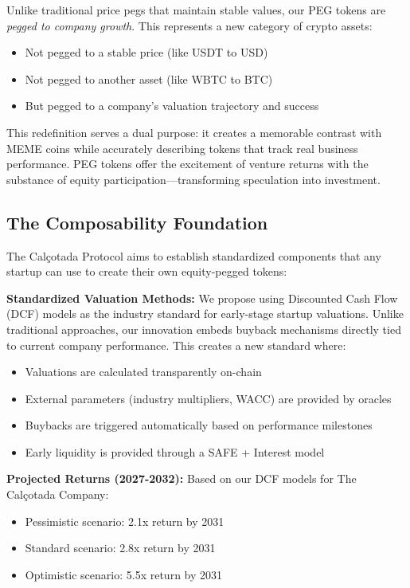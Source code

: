 \documentclass[conference]{IEEEtran}
\begin{document}
Unlike traditional price pegs that maintain stable values, our PEG tokens are \textit{pegged to company growth}. This represents a new category of crypto assets:
\begin{itemize}
    \item Not pegged to a stable price (like USDT to USD)
    \item Not pegged to another asset (like WBTC to BTC)
    \item But pegged to a company's valuation trajectory and success
\end{itemize}

This redefinition serves a dual purpose: it creates a memorable contrast with MEME coins while accurately describing tokens that track real business performance. PEG tokens offer the excitement of venture returns with the substance of equity participation—transforming speculation into investment.

\subsection{The Composability Foundation}

The Calçotada Protocol aims to establish standardized components that any startup can use to create their own equity-pegged tokens:

\textbf{Standardized Valuation Methods:}
We propose using Discounted Cash Flow (DCF) models as the industry standard for early-stage startup valuations. Unlike traditional approaches, our innovation embeds buyback mechanisms directly tied to current company performance. This creates a new standard where:
\begin{itemize}
    \item Valuations are calculated transparently on-chain
    \item External parameters (industry multipliers, WACC) are provided by oracles
    \item Buybacks are triggered automatically based on performance milestones
    \item Early liquidity is provided through a SAFE + Interest model
\end{itemize}

\textbf{Projected Returns (2027-2032):}
Based on our DCF models for The Calçotada Company:
\begin{itemize}
    \item Pessimistic scenario: 2.1x return by 2031
    \item Standard scenario: 2.8x return by 2031
    \item Optimistic scenario: 5.5x return by 2031
\end{itemize}
\end{document}
